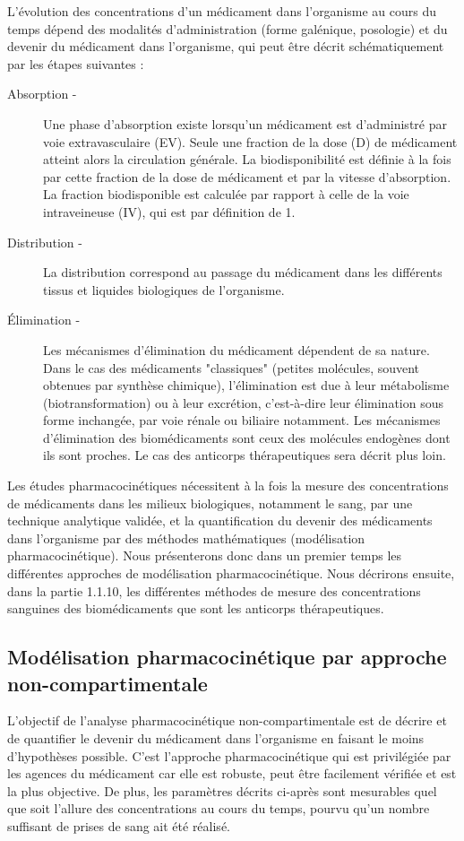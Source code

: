 L'évolution des concentrations d'un médicament dans l'organisme au cours du temps dépend des modalités d'administration (forme galénique, posologie) et du devenir du médicament dans l'organisme, qui peut être décrit schématiquement par les étapes suivantes :
\begin{description}
\item[Absorption -] Une phase d'absorption existe lorsqu'un médicament est d'administré par voie extravasculaire (EV). Seule une fraction de la dose (D) de médicament atteint alors la circulation générale. La biodisponibilité est définie à la fois par cette fraction de la dose de médicament et par la vitesse d'absorption. La fraction biodisponible est calculée par rapport à celle de la voie intraveineuse (IV), qui est par définition de 1.
\item[Distribution -] La distribution correspond au passage du médicament dans les différents tissus et liquides biologiques de l'organisme.
\item[Élimination -] Les mécanismes d'élimination du médicament dépendent de sa nature. Dans le cas des médicaments "classiques" (petites molécules, souvent obtenues par synthèse chimique), l'élimination est due à leur métabolisme (biotransformation) ou à leur excrétion, c'est-à-dire leur élimination sous forme inchangée, par voie rénale ou biliaire notamment. Les mécanismes d'élimination des biomédicaments sont ceux des molécules endogènes dont ils sont proches. Le cas des anticorps thérapeutiques sera décrit plus loin.
\end{description}

Les études pharmacocinétiques nécessitent à la fois la mesure des concentrations de médicaments dans les milieux biologiques, notamment le sang, par une technique analytique validée, et la quantification du devenir des médicaments dans l'organisme par des méthodes mathématiques (modélisation pharmacocinétique). Nous présenterons donc dans un premier temps les différentes approches de modélisation pharmacocinétique. Nous décrirons ensuite, dans la partie 1.1.10, les différentes méthodes de mesure des concentrations sanguines des biomédicaments que sont les anticorps thérapeutiques.

\subsection{Modélisation pharmacocinétique par approche non-compartimentale}
L'objectif de l'analyse pharmacocinétique non-compartimentale est de décrire et de quantifier le devenir du médicament dans l'organisme en faisant le moins d'hypothèses possible. C'est l'approche pharmacocinétique qui est privilégiée par les agences du médicament car elle est robuste, peut être facilement vérifiée et est la plus objective. De plus, les paramètres décrits ci-après sont mesurables quel que soit l'allure des concentrations au cours du temps, pourvu qu'un nombre suffisant de prises de sang ait été réalisé.

